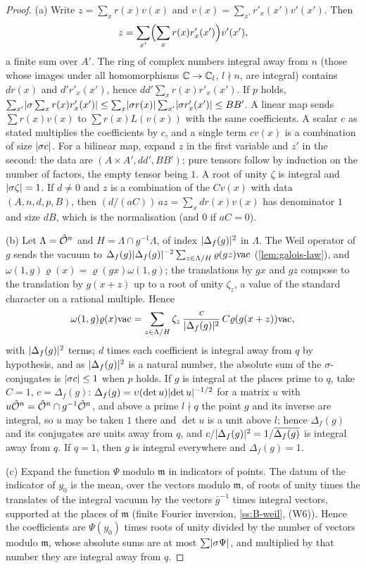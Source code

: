 \begin{proof}
(a) Write $z=\sum_xr(x)v(x)$ and $v(x)=\sum_{x'}r'_x(x')v'(x')$. Then
\[
  z=\sum_{x'}\Bigl(\sum_xr(x)r'_x(x')\Bigr)v'(x'),
\]
a finite sum over $A'$. The ring of complex numbers integral away from $n$ (those whose images under all homomorphisms $\mathbb{C}\to\mathbb{C}_l$, $l\nmid n$, are integral) contains $dr(x)$ and $d'r'_x(x')$, hence
$dd'\sum_xr(x)r'_x(x')$. If $p$ holds, $\sum_{x'}\lvert \sigma\sum_xr(x)r'_x(x')\rvert\le\sum_x\lvert \sigma r(x)\rvert\sum_{x'}\lvert \sigma r'_x(x')\rvert\le BB'$. A linear map sends $\sum r(x)v(x)$ to $\sum r(x)L(v(x))$ with the same coefficients. A scalar $c$ as stated multiplies the coefficients by $c$, and a single term $cv(x)$ is a combination of size $\lvert \sigma c\rvert$. For a
bilinear map, expand $z$ in the first variable and $z'$ in the second: the data are $(A\times A',dd',BB')$; pure tensors follow by induction on the number of factors, the empty tensor being $1$. A root of unity $\zeta$ is integral and $\lvert \sigma\zeta\rvert=1$. If $d\ne0$ and $z$ is a combination of the $Cv(x)$ with data $(A,n,d,p,B)$, then
$(d/(aC))\,az=\sum_xdr(x)v(x)$ has denominator $1$ and size $dB$, which is the normalisation (and $0$ if $aC=0$).

(b) Let $\Lambda=\hat{\mathcal{O}}^n$ and $H=\Lambda\cap g^{-1}\Lambda$, of index $\lvert \Delta_f(g)\rvert^2$ in $\Lambda$. The Weil operator of $g$ sends the vacuum to $\Delta_f(g)\lvert \Delta_f(g)\rvert^{-2}\sum_{z\in\Lambda/H}\varrho(gz)\mathrm{vac}$ (\cref{lem:galois-law}), and $\omega(1,g)\varrho(x)=\varrho(gx)\omega(1,g)$; the translations by $gx$ and
$gz$ compose to the translation by $g(x+z)$ up to a root of unity $\zeta_z$, a value of the standard character on a rational multiple. Hence
\[
  \omega(1,g)\varrho(x)\mathrm{vac}=\sum_{z\in\Lambda/H}\zeta_z\,\frac c{\lvert \Delta_f(g)\rvert^2}\,C\varrho(g(x+z))\mathrm{vac},
\]
with $\lvert \Delta_f(g)\rvert^2$ terms; $d$ times each coefficient is integral away from $q$ by hypothesis, and as $\lvert \Delta_f(g)\rvert^2$ is a natural number, the absolute sum of the $\sigma$-conjugates is $\lvert \sigma c\rvert\le1$ when $p$ holds. If $g$ is integral at the places prime to $q$, take $C=1$, $c=\Delta_f(g)$:
$\Delta_f(g)=\upsilon(\det u)\lvert \det u\rvert^{-1/2}$ for a matrix $u$ with $u\hat{\mathcal{O}}^n=\hat{\mathcal{O}}^n\cap g^{-1}\hat{\mathcal{O}}^n$, and above a prime $l\nmid q$ the point $g$ and its inverse are integral, so $u$ may be taken $1$ there and $\det u$ is a unit above $l$; hence $\Delta_f(g)$ and its conjugates are units away from $q$, and
$c/\lvert \Delta_f(g)\rvert^2=1/\overline{\Delta_f(g)}$ is integral away from $q$. If $q=1$, then $g$ is integral everywhere and $\Delta_f(g)=1$.

(c) Expand the function $\Psi$ modulo $\mathfrak m$ in indicators of points. The datum of the indicator of $y_0$ is the mean, over the vectors modulo $\mathfrak m$, of roots of unity times the translates of the integral vacuum by the vectors $\bar g^{-1}$ times integral vectors, supported at the places of $\mathfrak m$ (finite Fourier inversion, \cref{ss:B-weil},
(W6)). Hence the coefficients are $\Psi(y_0)$ times roots of unity divided by the number of vectors modulo $\mathfrak m$, whose absolute sums are at most $\sum\lvert \sigma\Psi\rvert$, and multiplied by that number they are integral away from $q$.
\end{proof}

